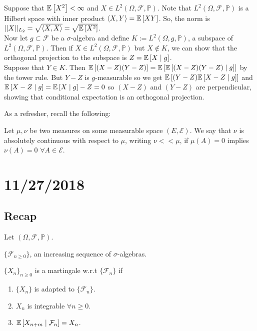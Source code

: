 \documentclass[english, course]{Notes}
\begin{document}
\begin{remark}
	Suppose that $\mathbb{E}\left[X^2\right] < \infty$ and $X \in L^2(\Omega, \mathcal{F}, \mathbb{P})$. Note that $L^2(\Omega, \mathcal{F}, \mathbb{P})$ is a Hilbert space with inner product $\langle X, Y \rangle = \mathbb{E}\left[X Y\right]$. So, the norm is $||X||_{L_2} = \sqrt{\langle X, X \rangle} = \sqrt{\mathbb{E}\left[X^2\right]}$.\\
	
	Now let $g \subset \mathcal{F}$ be a $\sigma$-algebra and define $K := L^2(\Omega, g, \mathbb{P})$, a subspace of $L^2(\Omega, \mathcal{F}, \mathbb{P})$. Then if $X \in L^2(\Omega, \mathcal{F}, \mathbb{P})$ but $X \not \in K$, we can show that the orthogonal projection to the subspace is $Z = \mathbb{E}\left[X \mid g\right]$.\\
	
	Suppose that $Y \in K$. Then $\mathbb{E}\left[(X - Z)(Y - Z)\right] = \mathbb{E}\left[\mathbb{E}\left[(X - Z)(Y - Z) \mid g\right]\right]$ by the tower rule. But $Y - Z$ is $g$-measurable so we get $\mathbb{E}\left[(Y - Z) \mathbb{E}\left[X - Z \mid g\right]\right]$ and $\mathbb{E}\left[X - Z \mid g\right] = \mathbb{E}\left[X \mid g\right] - Z = 0$ so $(X - Z)$ and $(Y - Z)$ are perpendicular, showing that conditional expectation is an orthogonal projection.
\end{remark}

As a refresher, recall the following:

\begin{definition}
Let $\mu, \nu$ be two measures on some measurable space $(E, \mathcal{E})$. We say that $\nu$ is absolutely continuous with respect to $\mu$, writing $\nu << \mu$, if $\mu(A) = 0$ implies $\nu(A) = 0$ $\forall A \in \mathcal{E}$.
\end{definition}

\section{11/27/2018}

\subsection{Recap}

Let $(\Omega, \mathcal{F}, \mathbb{P})$.

\begin{definition}[Filtration]
	$\{\mathcal{F}_{n \geq 0}\}$, an increasing sequence of $\sigma$-algebras.
\end{definition}

\begin{definition}[Martingale]
	$\{X_n\}_{n \geq 0}$ is a martingale w.r.t $\{\mathcal{F}_n\}$ if
	\begin{enumerate}
		\item $\{X_n\}$ is adapted to $\{\mathcal{F}_n\}$.
		\item $X_n$ is integrable $\forall n \geq 0$.
		\item $\mathbb{E}\left[X_{n + m} \mid \mathcal{F}_n\right] = X_n$.
	\end{enumerate}
\end{definition}
\end{document}
